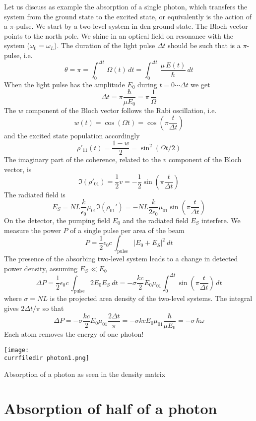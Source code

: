 Let us discuss as example the absorption of a single photon, which transfers the system from the ground state to the excited state, or equivalently is the action of a $\pi$-pulse. We start by a two-level system in den ground state. The Bloch vector points to the north pole. We shine in an optical field on resonance with the system ($\omega_0 = \omega_L$). The duration of the light pulse $\Delta t$ should be such that is a $\pi$-pulse, i.e.
\[
 \theta = \pi = \int_0^{\Delta t} \, \Omega(t) \, dt =  \int_0^{\Delta t} \, \frac{ \mu \, E(t)}{\hbar} \, dt
\]
When the light pulse has the amplitude $E_0$ during $t= 0 \cdots \Delta t$ we get
\[
 \Delta t = \pi \frac{\hbar}{\mu E_0}  = \pi \, \frac{1}{\Omega}
\] 
The $w$ component of the Bloch vector follows the Rabi oscillation, i.e.
\[
 w(t) = \cos ( \Omega t  ) = \cos \left( \pi  \frac{t}{\Delta t} \right)
\]
and the excited state population accordingly
\[
 \rho'_{11}(t) = \frac{1 - w}{2}  = \sin^2 ( \Omega t /2 )
\]
The imaginary part of the coherence, related to the $v$ component of the Bloch vector, is
\[
 \Im (\rho'_{01} ) = \frac{1}{2} v =  - \frac{1}{2}  \sin \left( \pi \frac{t}{\Delta t} \right)
\]
The radiated field is 
\[
 E_S  = N L \frac{k }{\epsilon_0}  \mu_{01} \Im (\rho_{01}' ) 
 = - N L \frac{k }{2 \epsilon_0}  \mu_{01} \sin \left( \pi \frac{t}{\Delta t} \right)
\]
On the detector, the pumping field $E_0$ and the radiated field $E_S$ interfere. We measure the power $P$ of a single pulse per area of the beam  
\[
P  = \frac{1}{2} \epsilon_0 c \, \int_\text{pulse} | E_0 + E_S |^2 \ dt
\]
The presence of the absorbing two-level system leads to a change in detected power density, assuming $E_S \ll E_0$
\[
 \Delta P = \frac{1}{2} \epsilon_0 c \,  
\int_\text{pulse} 2 E_0 E_S  \ dt
  =-   \sigma \frac{k c }{2}  E_0 \mu_{01}  \int_0^{\Delta t}   \sin \left( \pi \frac{t}{\Delta t} \right)  \,  dt
\]
where $\sigma = N L $ is the projected area density of the two-level systems. The integral gives $2 \Delta t/\pi$ so that
\[
 \Delta P =-  \sigma \frac{k c}{2}  E_0 \mu_{01} \frac{2 \Delta t}{\pi}
= -  \sigma k c   E_0 \mu_{01}  \frac{\hbar}{\mu E_0} 
= -  \sigma \,  \hbar \omega  
\]
Each atom removes the energy of one photon!

\begin{marginfigure}
\texttt{[image: \\currfiledir photon1.png]}
\caption{Absorption of a photon as seen in the density matrix}
\end{marginfigure}


\section{Absorption of half of a photon}

